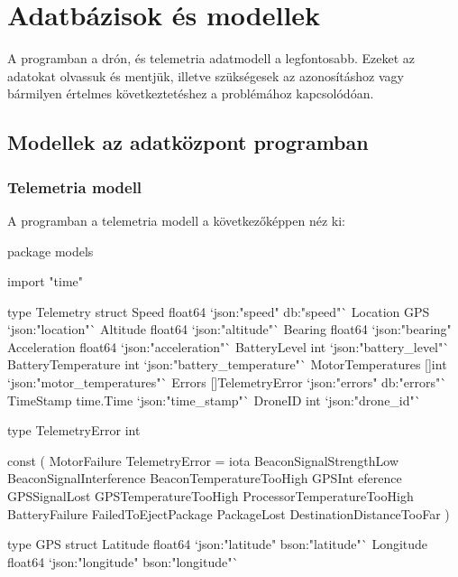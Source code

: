 

\section{Adatbázisok és modellek}
A programban a drón, és telemetria adatmodell a legfontosabb.
Ezeket az adatokat olvassuk és mentjük, illetve szükségesek az azonosításhoz vagy bármilyen értelmes következtetéshez a problémához kapcsolódóan.

\subsection{Modellek az adatközpont programban}
\subsubsection{Telemetria modell}
A programban a telemetria modell a következőképpen néz ki:

\begin{python}
    package models

    import "time"

    type Telemetry struct {
        Speed              float64          `json:"speed" db:"speed"`
        Location           GPS              `json:"location"`
        Altitude           float64          `json:"altitude"`
        Bearing            float64          `json:"bearing"
        Acceleration       float64          `json:"acceleration"`
        BatteryLevel       int              `json:"battery_level"`
        BatteryTemperature int              `json:"battery_temperature"`
        MotorTemperatures  []int            `json:"motor_temperatures"`
        Errors             []TelemetryError `json:"errors" db:"errors"`
        TimeStamp          time.Time        `json:"time_stamp"`
        DroneID            int              `json:"drone_id"`
    }

    type TelemetryError int

    const (
        MotorFailure TelemetryError = iota
        BeaconSignalStrengthLow
        BeaconSignalInterference
        BeaconTemperatureTooHigh
        GPSInt	eference
        GPSSignalLost
        GPSTemperatureTooHigh
        ProcessorTemperatureTooHigh
        BatteryFailure
        FailedToEjectPackage
        PackageLost
        DestinationDistanceTooFar
    )

    type GPS struct {
        Latitude  float64 `json:"latitude" bson:"latitude"`
        Longitude float64 `json:"longitude" bson:"longitude"`
    }

\end{python}


